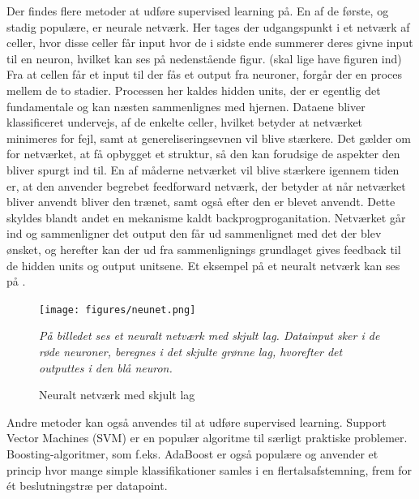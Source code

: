 Der findes flere metoder at udføre supervised learning på. En af de første, og stadig populære, er neurale netværk. Her tages der udgangspunkt i et netværk af celler, hvor disse celler får input hvor de i sidste ende summerer deres givne input til en neuron, hvilket kan ses på nedenstående figur. (skal lige have figuren ind)
Fra at cellen får et input til der fås et output fra neuroner, forgår der en proces mellem de to stadier. Processen her kaldes hidden units, der er egentlig det fundamentale og kan næsten sammenlignes med hjernen. Dataene bliver klassificeret undervejs, af de enkelte celler, hvilket betyder at netværket minimeres for fejl, samt at genereliseringsevnen vil blive stærkere. Det gælder om for netværket, at få opbygget et struktur, så den kan forudsige de aspekter den bliver spurgt ind til. \cite{DIKU2010} En af måderne netværket vil blive stærkere igennem tiden er, at den anvender begrebet feedforward netværk, der betyder at når netværket bliver anvendt bliver den trænet, samt også efter den er blevet anvendt. Dette skyldes blandt andet en mekanisme kaldt backprogproganitation. Netværket går ind og sammenligner det output den får ud sammenlignet med det der blev ønsket, og herefter kan der ud fra sammenlignings grundlaget gives feedback til de hidden units og output unitsene.  Et eksempel på et neuralt netværk kan ses på .

\begin{figure}[H]
	\centering
	\texttt{[image: figures/neunet.png]}
	\flushleft 
	\caption{Neuralt netværk med skjult lag}
	\label{dt}
	\flushleft
	\textit{På billedet ses et neuralt netværk med skjult lag. Datainput sker i de røde neuroner, beregnes i det skjulte grønne lag, hvorefter det outputtes i den blå neuron.}
\end{figure}

Andre metoder kan også anvendes til at udføre supervised learning. Support Vector Machines (SVM) er en populær algoritme til særligt praktiske problemer. Boosting-algoritmer, som f.eks. AdaBoost er også populære og anvender et princip hvor mange simple klassifikationer samles i en flertalsafstemning, frem for ét beslutningstræ per datapoint.